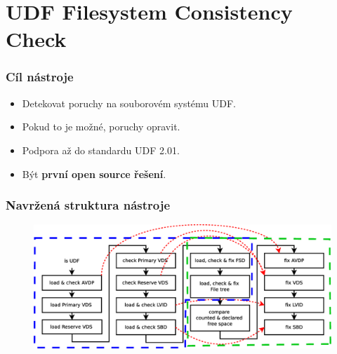 \documentclass[aspectratio=169]{beamer}
\begin{document}
    \section{UDF Filesystem Consistency Check}
        \begin{frame}
            \frametitle{Cíl nástroje}
            \vspace{30pt}
            \begin{itemize}
                \huge\item Detekovat poruchy na souborovém systému UDF.
                \huge\item Pokud to je možné, poruchy opravit.
                \huge\item Podpora až do standardu UDF 2.01.
                \huge\item Být \textbf{první open source řešení}.
            \end{itemize}
        \end{frame}
        \begin{frame}
            \frametitle{Navržená struktura nástroje}
			\vspace{30 pt}
			\center
            \begin{figure}
			    \includegraphics[width=14.8cm]{steps-korekce.eps}
            \end{figure}
        \end{frame}
\end{document}
